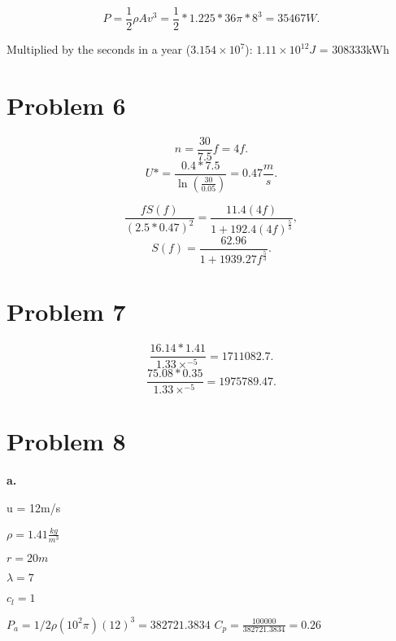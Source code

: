 \documentclass[11pt]{article}
\begin{document}
\[
    P = \frac{1}{2}\rho A v^3 = \frac{1}{2}*1.225*36\pi*8^3 = 35467W
.\] 

Multiplied by the seconds in a year ($3.154\times10^{7}$): $1.11\times10^{12}J$ =
308333kWh

\section{Problem 6}

\[
n = \frac{30}{7.5}f = 4f
.\] 
\[
U* = \frac{0.4 * 7.5}{\ln\left( \frac{30}{0.05} \right) } = 0.47 \frac{m}{s}
.\] 

\[
    \frac{fS(f)}{\left( 2.5*0.47 \right)^2 } = \frac{11.4\left( 4f \right) }{1 +
    192.4\left( 4f \right)^{\frac{5}{3}} }

,\] 
\[
    S(f) = \frac{62.96}{1 + 1939.27f^{\frac{5}{3}}}
.\] 

\section{Problem 7}

\[
    \frac{16.14 * 1.41}{1.33\times^{-5}} = 1711082.7
.\] 
\[
    \frac{75.08 * 0.35}{1.33\times^{-5}} = 1975789.47
.\] 

\section{Problem 8}

\textbf{a.}

u = 12m/s

$\rho = 1.41 \frac{kg}{m^3}$

$r = 20m$

$\lambda = 7$

$c_l = 1$


$P_a = 1/2\rho(10^2\pi)(12)^3 = 382721.3834$
$C_p = \frac{100000}{382721.3834} = 0.26$
\end{document}
